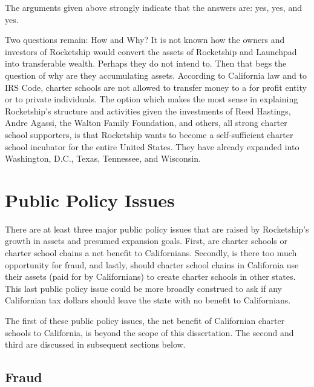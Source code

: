 The arguments given above strongly indicate that the answers are: yes, yes, and yes.

Two questions remain: How and Why? It is not known how the owners and investors of Rocketship would convert the assets of Rocketship and Launchpad into transferable wealth. Perhaps they do not intend to. Then that begs the question of why are they accumulating assets. According to California law and to IRS Code, charter schools are not allowed to transfer money to a for profit entity or to private individuals. The option which makes the most sense in explaining Rocketship's structure and activities given the investments of Reed Hastings, Andre Agassi, the Walton Family Foundation, and others, all strong charter school supporters, is that Rocketship wants to become a self-sufficient charter school incubator for the entire United States.
They have already expanded into Washington, D.C., Texas, Tennessee, and Wisconsin.
\section{Public Policy Issues}%
\label{sec:publ-policy-chang}\indent%

There are at least three major public policy issues that are raised by Rocketship's growth in assets and presumed expansion goals. First, are charter schools or charter school chains a net benefit to Californians. Secondly, is there too much opportunity for fraud, and lastly, should charter school chains in California use their assets (paid for by Californians) to create charter schools in other states. This last public policy issue could be more broadly construed to ask if any Californian tax dollars should leave the state with no benefit to Californians.

The first of these public policy issues, the net benefit of Californian charter schools to California, is beyond the scope of this dissertation. The second and third are discussed in subsequent sections below.

\subsection{Fraud}%
\label{sec:fraud}\indent%

